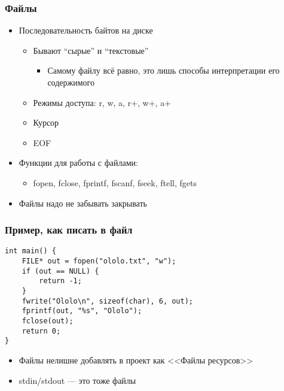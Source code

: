 \documentclass{../../slides-style}
\begin{document}
    \begin{frame}
        \frametitle{Файлы}
        \begin{itemize}
            \item Последовательность байтов на диске
            \begin{itemize}
                \item Бывают ``сырые'' и ``текстовые''
                \begin{itemize}
                    \item Самому файлу всё равно, это лишь способы интерпретации его содержимого
                \end{itemize}
                \item Режимы доступа: r, w, a, r+, w+, a+
                \item Курсор
                \item EOF
            \end{itemize}
            \item Функции для работы с файлами:
            \begin{itemize}
                \item fopen, fclose, fprintf, fscanf, fseek, ftell, fgets
            \end{itemize}
            \item Файлы надо не забывать закрывать
        \end{itemize}
    \end{frame}

    \begin{frame}[fragile]
        \frametitle{Пример, как писать в файл}
        \begin{verbatim}
int main() {
    FILE* out = fopen("ololo.txt", "w");
    if (out == NULL) {
        return -1;
    }
    fwrite("Ololo\n", sizeof(char), 6, out);
    fprintf(out, "%s", "Ololo");
    fclose(out);
    return 0;
}
        \end{verbatim}
        \begin{itemize}
            \item Файлы нелишне добавлять в проект как <<Файлы ресурсов>>
            \item stdin/stdout --- это тоже файлы
        \end{itemize}
    \end{frame}
\end{document}
